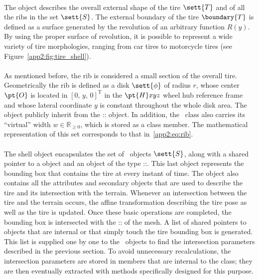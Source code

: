 \paragraph{\Shape{}}
The \Shape{} object describes the overall external shape of the tire $\sett{T}$ and of all the ribs in the set $\sett{S}$. The external boundary of the tire $\boundary{T}$ is defined as a surface generated by the revolution of an arbitrary function $R(y)$. By using the proper surface of revolution, it is possible to represent a wide variety of tire morphologies, ranging from car tires to motorcycle tires (see Figure~\ref{app2:fig:tire_shell}).

\paragraph{\Rib{}}
As mentioned before, the rib is considered a small section of the overall tire. Geometrically the rib is defined as a disk $\sett{\phi}$ of radius $r$, whose center $\pt{O}$ is located in $[0, \, y, \, 0]^\mathrm{T}$ in the $\pt{H}xyz$ wheel hub reference frame and whose lateral coordinate $y$ is constant throughout the whole disk area. The~\Rib{} object publicly inherit from the \Acme{}::\Disk{} object. In addition, the~\Rib{} class also carries its ``virtual'' width $w \in \mathbb{R}_{\geq 0}$, which is stored as a class member. The mathematical representation of this set corresponds to that in~\eqref{app2:eq:rib}.

\paragraph{\Shell{}}
The shell object encapsulates the set of~\Rib{} objects $\sett{S}$, along with a shared pointer to a \Shape{} object and an object of the type \Acme{}::\Aabb{}. This last object represents the bounding box that contains the tire at every instant of time. The \Shell{} object also contains all the attributes and secondary objects that are used to describe the tire and its intersection with the terrain. Whenever an intersection between the tire and the terrain occurs, the affine transformation describing the tire pose as well as the tire \Aabb{} is updated. Once these basic operations are completed, the bounding box is intersected with the \Acme{}::\AabbTree{} of the mesh. A list of shared pointers to \TriangleGround{} objects that are internal or that simply touch the tire bounding box is generated. This list is supplied one by one to the~\Rib{} objects to find the intersection parameters described in the previous section. To avoid unnecessary recalculations, the intersection parameters are stored in members that are internal to the \Shell{} class; they are then eventually extracted with methods specifically designed for this purpose.

